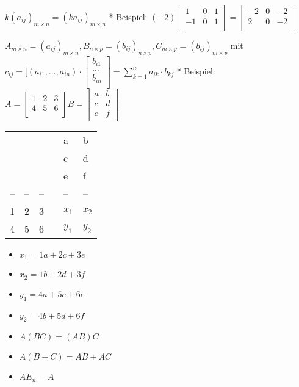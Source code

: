 \documentclass{../tudscript}
\begin{document}
\hypertarget{zu-3.}{%
\label{zu-3.}}

\(k (a_{ij})_{m \times n} = (k a_{ij})_{m \times n}\) * Beispiel:
\((-2)\begin{bmatrix}  1 & 0 & 1 \\  -1 & 0 & 1 \\ \end{bmatrix}=\begin{bmatrix}  -2 & 0 & -2 \\  2 & 0 & -2 \\ \end{bmatrix}\)

\hypertarget{zu-5.}{%
\label{zu-5.}}

\(A_{m \times n} = (a_{ij})_{m \times n} , B_{n\times p }=(b_{ij})_{n \times p}, C_{m\times p }=(b_{ij})_{m \times p}\)
mit
\(c_{ij} = \lbrack (a_{i1},...,a_{in}) \cdot \begin{bmatrix}  b_{i1} \\  \dots \\  b_{in} \\ \end{bmatrix} = \sum_ {k=1}^n a_{ik} \cdot b_{kj}\)
* Beispiel:
\(A=\begin{bmatrix}  1 & 2 & 3 \\  4 & 5 & 6 \\ \end{bmatrix} B=\begin{bmatrix}  a & b \\  c & d \\  e & f \\ \end{bmatrix}\)

\begin{longtable}[]{@{}llllll@{}}
\toprule
\endhead
& & & & a & b\tabularnewline
& & & & c & d\tabularnewline
& & & & e & f\tabularnewline
-- & -- & -- & & -- & --\tabularnewline
1 & 2 & 3 & & \(x_1\) & \(x_2\)\tabularnewline
4 & 5 & 6 & & \(y_1\) & \(y_2\)\tabularnewline
\bottomrule
\end{longtable}

\begin{itemize}
\item
  \(x_1=1a +2c +3e\)
\item
  \(x_2 = 1b+2d+3f\)
\item
  \(y_1 =4a+5c+6e\)
\item
  \(y_2= 4b+5d+6f\)
\item
  \(A(BC) =(AB)C\)
\item
  \(A(B+C)= AB+AC\)
\item
  \(AE_n =A\)
\end{itemize}
\end{document}
